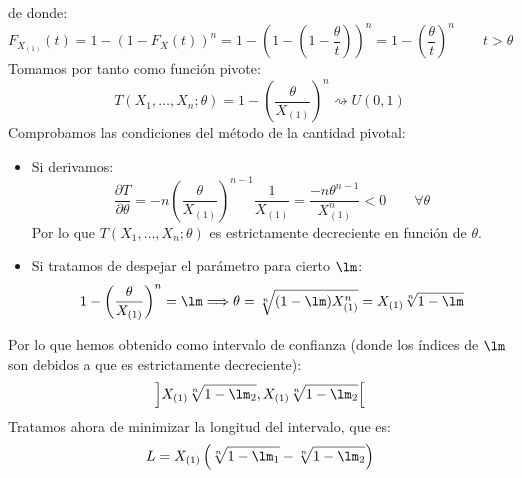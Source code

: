 \begin{ejercicio}
    de donde:
    \begin{equation*}
        F_{X_{(1)}}(t) = 1-{(1-F_X(t))}^{n} = 1 - {\left(1-\left(1-\frac{\theta}{t}\right)\right)}^{n} = 1-{\left(\frac{\theta}{t}\right)}^{n} \qquad t> \theta
    \end{equation*}
    Tomamos por tanto como función pivote:
    \begin{equation*}
        T(X_1, \ldots, X_n;\theta) = 1-{\left(\frac{\theta}{X_{(1)}}\right)}^{n} \rightsquigarrow U(0,1)
    \end{equation*}
    Comprobamos las condiciones del método de la cantidad pivotal:
    \begin{itemize}
        \item Si derivamos:
            \begin{equation*}
                \dfrac{\partial T}{\partial \theta} = -n{\left(\frac{\theta}{X_{(1)}}\right)}^{n-1} \frac{1}{X_{(1)}} = \frac{-n\theta^{n-1}}{X_{(1)}^n} < 0 \qquad \forall \theta
            \end{equation*}
            Por lo que $T(X_1, \ldots, X_n;\theta)$ es estrictamente decreciente en función de $\theta$.
        \item Si tratamos de despejar el parámetro para cierto $\lm$:
            \begin{equation*}
                1-{\left(\frac{\theta}{X_{(1)}}\right)}^{n} = \lm \Longrightarrow \theta = \sqrt[n]{(1-\lm)X_{(1)}^n}  = X_{(1)}\sqrt[n]{1-\lm}
            \end{equation*}
    \end{itemize}
    Por lo que hemos obtenido como intervalo de confianza (donde los índices de $\lm$ son debidos a que es estrictamente decreciente):
    \begin{equation*}
        \left]X_{(1)}\sqrt[n]{1-\lm_2}, X_{(1)}\sqrt[n]{1-\lm_2}\right[
    \end{equation*}
    Tratamos ahora de minimizar la longitud del intervalo, que es:
    \begin{equation*}
        L = X_{(1)}\left(\sqrt[n]{1-\lm_1} - \sqrt[n]{1-\lm_2}\right)
    \end{equation*}


\end{ejercicio}

